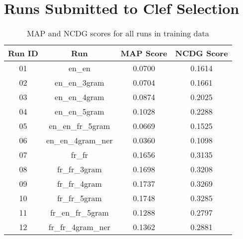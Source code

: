 \section{Runs Submitted to Clef Selection}
\label{sec:runs_selection}

\begin{table}[h!]
    \begin{center}
        \caption{MAP and NCDG scores for all runs in training data}
        \label{tab:all_scores}
        \begin{tabular}{|c|c||c|c|}
            \hline
            \textbf{Run ID} & \textbf{Run} & \textbf{MAP Score} & \textbf{NCDG Score}\\
            \hline\hline
            01 & en\_en & \cellcolor{red!30!white}0.0700 & \cellcolor{red!30!white}0.1614 \\
            \hline
            02 & en\_en\_3gram & 0.0704 & 0.1661 \\
            \hline
            03 & en\_en\_4gram & 0.0874 & 0.2025 \\
            \hline
            04 & en\_en\_5gram & 0.1028 & 0.2288 \\
            \hline
            05 & en\_en\_fr\_5gram & \cellcolor{red!60!white}0.0669 & \cellcolor{red!60!white}0.1525 \\
            \hline
            06 & en\_en\_4gram\_ner & \cellcolor{red}0.0360 & \cellcolor{red}0.1098 \\
            \hline
            07 & fr\_fr & 0.1656 & 0.3135 \\
            \hline
            08 & fr\_fr\_3gram & \cellcolor{green!30!white}0.1698 & \cellcolor{green!30!white}0.3208 \\
            \hline
            09 & fr\_fr\_4gram & \cellcolor{green!60!white}0.1737 & \cellcolor{green!60!white}0.3269 \\
            \hline
            10 & fr\_fr\_5gram & \cellcolor{green}0.1748 & \cellcolor{green}0.3285 \\
            \hline
            11 & fr\_en\_fr\_5gram & 0.1288 & 0.2797 \\
            \hline
            12 & fr\_fr\_4gram\_ner & 0.1362 & 0.2881 \\
            \hline
        \end{tabular}
    \end{center}
\end{table}


